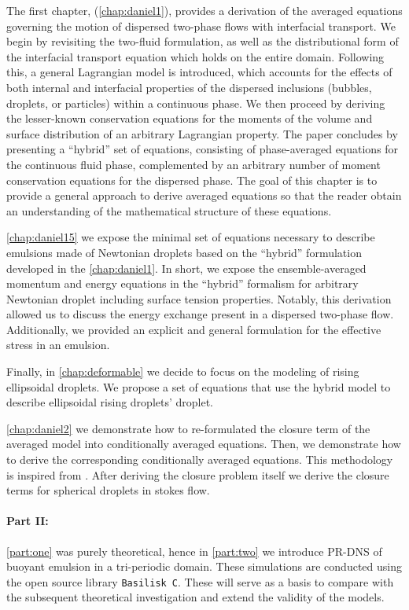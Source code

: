 The first chapter, (\ref{chap:daniel1}), provides a derivation of the averaged equations governing the motion of dispersed two-phase flows with interfacial transport. 
We begin by revisiting the two-fluid formulation, as well as the distributional form of the interfacial transport equation which holds on the entire domain. 
Following this, a general Lagrangian model is introduced, which accounts for the effects of both internal and interfacial properties of the dispersed inclusions (bubbles, droplets, or particles) within a continuous phase.
We then proceed by deriving the lesser-known conservation equations for the moments of the volume and surface distribution of an arbitrary Lagrangian property.
The paper concludes by presenting a ``hybrid'' set of equations, consisting of phase-averaged equations for the continuous fluid phase, complemented by an arbitrary number of moment conservation equations for the dispersed phase.
The goal of this chapter is to provide a general approach to derive averaged equations so that the reader obtain an understanding of the mathematical structure of these equations. 

\ref{chap:daniel15} we expose the minimal set of equations necessary to describe emulsions made of Newtonian droplets based on the ``hybrid'' formulation developed in the \ref{chap:daniel1}. 
In short, we expose the ensemble-averaged momentum and energy equations in the ``hybrid'' formalism for arbitrary Newtonian droplet including surface tension properties. 
Notably, this derivation allowed us to discuss the energy exchange present in a dispersed two-phase flow. 
Additionally, we provided an explicit and general formulation for the effective stress in an emulsion. 

Finally, in \ref{chap:deformable} we decide to focus on the modeling of rising ellipsoidal droplets. 
We propose a set of equations that use the hybrid model to describe ellipsoidal rising droplets' droplet. 


\ref{chap:daniel2} we demonstrate how to re-formulated the closure term of the averaged model into conditionally averaged equations. 
Then, we demonstrate how to derive the corresponding conditionally averaged equations. 
This methodology is inspired from \citet{hinch1977averaged}.
After deriving the closure problem itself we derive the closure terms for spherical droplets in stokes flow.  




\paragraph*{Part II:} 
\ref{part:one} was purely theoretical, hence in \ref{part:two} we introduce PR-DNS of buoyant emulsion in a tri-periodic domain. 
These simulations are conducted using the open source library \texttt{Basilisk C}.
These will serve as a basis to compare with the subsequent theoretical investigation and extend the validity of the models.  

